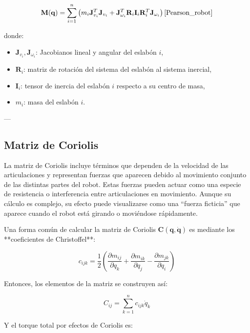 \begin{equation}
	\mathbf{M}(\mathbf{q}) = \sum_{i=1}^n \left( m_i \mathbf{J}_{v_i}^T \mathbf{J}_{v_i} + \mathbf{J}_{\omega_i}^T \mathbf{R}_i \mathbf{I}_i \mathbf{R}_i^T \mathbf{J}_{\omega_i} \right)
	\cite{Pearson_robot}
\end{equation}

donde:
\begin{itemize}
	\item \(\mathbf{J}_{v_i}, \mathbf{J}_{\omega_i}\): Jacobianos lineal y angular del eslabón \(i\),
	\item \(\mathbf{R}_i\): matriz de rotación del sistema del eslabón al sistema inercial,
	\item \(\mathbf{I}_i\): tensor de inercia del eslabón \(i\) respecto a su centro de masa,
	\item \(m_i\): masa del eslabón \(i\).
\end{itemize}

---

\subsection{Matriz de Coriolis}

La matriz de Coriolis incluye términos que dependen de la velocidad de las articulaciones y representan fuerzas que aparecen debido al movimiento conjunto de las distintas partes del robot. Estas fuerzas pueden actuar como una especie de resistencia o interferencia entre articulaciones en movimiento. Aunque su cálculo es complejo, su efecto puede visualizarse como una “fuerza ficticia” que aparece cuando el robot está girando o moviéndose rápidamente.

Una forma común de calcular la matriz de Coriolis \(\mathbf{C}(\mathbf{q}, \dot{\mathbf{q}})\) es mediante los **coeficientes de Christoffel**:

\begin{equation}
	c_{ijk} = \frac{1}{2} \left( \frac{\partial m_{ij}}{\partial q_k} + \frac{\partial m_{ik}}{\partial q_j} - \frac{\partial m_{jk}}{\partial q_i} \right)
\end{equation}

Entonces, los elementos de la matriz se construyen así:

\begin{equation}
	C_{ij} = \sum_{k=1}^n c_{ijk} \dot{q}_k
\end{equation}

Y el torque total por efectos de Coriolis es:

